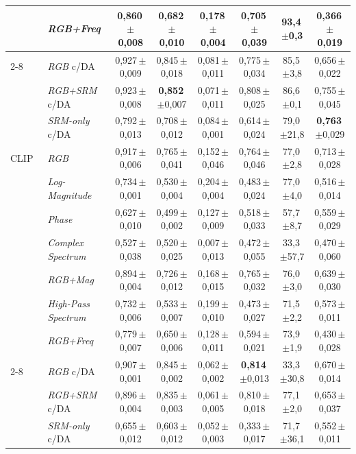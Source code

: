 \documentclass[10pt,conference]{IEEEtran}
\newcommand{\pmsd}[2]{#1\,{\scriptsize$\pm$#2}}
\begin{document}
\begin{table}[!t]
\begin{tabular}{@{}ll ccc ccc@{}}
 & \textit{RGB+Freq} & \pmsd{0,860}{0,008} & \pmsd{0,682}{0,010} & \pmsd{0,178}{0,004} & \pmsd{0,705}{0,039} & \pmsd{\textbf{93,4}}{0,3} & \pmsd{0,366}{0,019} \\
 \cmidrule(l){2-8}
 & \textit{RGB} c/DA & \pmsd{0,927}{0,009} & \pmsd{0,845}{0,018} & \pmsd{0,081}{0,011} & \pmsd{0,775}{0,034} & \pmsd{85,5}{3,8} & \pmsd{0,656}{0,022} \\
 & \textit{RGB+SRM} c/DA & \pmsd{0,923}{0,008} & \pmsd{\textbf{0,852}}{0,007} & \pmsd{0,071}{0,011} & \pmsd{0,808}{0,025} & \pmsd{86,6}{0,1} & \pmsd{0,755}{0,045} \\
 & \textit{SRM-only} c/DA & \pmsd{0,792}{0,013} & \pmsd{0,708}{0,012} & \pmsd{0,084}{0,001} & \pmsd{0,614}{0,024} & \pmsd{79,0}{21,8} & \pmsd{\textbf{0,763}}{0,029} \\
\midrule
CLIP~\cite{ref_clip} & \textit{RGB} & \pmsd{0,917}{0,006} & \pmsd{0,765}{0,041} & \pmsd{0,152}{0,046} & \pmsd{0,764}{0,046} & \pmsd{77,0}{2,8} & \pmsd{0,713}{0,028} \\
 & \textit{Log-Magnitude} & \pmsd{0,734}{0,001} & \pmsd{0,530}{0,004} & \pmsd{0,204}{0,004} & \pmsd{0,483}{0,024} & \pmsd{77,0}{4,0} & \pmsd{0,516}{0,014} \\
 & \textit{Phase} & \pmsd{0,627}{0,010} & \pmsd{0,499}{0,002} & \pmsd{0,127}{0,009} & \pmsd{0,518}{0,033} & \pmsd{57,7}{8,7} & \pmsd{0,559}{0,029} \\
 & \textit{Complex Spectrum} & \pmsd{0,527}{0,038} & \pmsd{0,520}{0,025} & \pmsd{0,007}{0,013} & \pmsd{0,472}{0,055} & \pmsd{33,3}{57,7} & \pmsd{0,470}{0,060} \\
 & \textit{RGB+Mag} & \pmsd{0,894}{0,004} & \pmsd{0,726}{0,012} & \pmsd{0,168}{0,015} & \pmsd{0,765}{0,032} & \pmsd{76,0}{3,0} & \pmsd{0,639}{0,030} \\
 & \textit{High-Pass Spectrum} & \pmsd{0,732}{0,006} & \pmsd{0,533}{0,007} & \pmsd{0,199}{0,010} & \pmsd{0,473}{0,027} & \pmsd{71,5}{2,2} & \pmsd{0,573}{0,011} \\
 & \textit{RGB+Freq} & \pmsd{0,779}{0,007} & \pmsd{0,650}{0,006} & \pmsd{0,128}{0,011} & \pmsd{0,594}{0,021} & \pmsd{73,9}{1,9} & \pmsd{0,430}{0,028} \\
 \cmidrule(l){2-8}
 & \textit{RGB} c/DA & \pmsd{0,907}{0,001} & \pmsd{0,845}{0,002} & \pmsd{0,062}{0,002} & \pmsd{\textbf{0,814}}{0,013} & \pmsd{33,3}{30,8} & \pmsd{0,670}{0,014} \\
 & \textit{RGB+SRM} c/DA & \pmsd{0,896}{0,004} & \pmsd{0,835}{0,003} & \pmsd{0,061}{0,005} & \pmsd{0,810}{0,018} & \pmsd{77,1}{2,0} & \pmsd{0,653}{0,037} \\
 & \textit{SRM-only} c/DA & \pmsd{0,655}{0,012} & \pmsd{0,603}{0,012} & \pmsd{0,052}{0,003} & \pmsd{0,333}{0,017} & \pmsd{71,7}{36,1} & \pmsd{0,552}{0,011} \\
\bottomrule
\end{tabular}
\end{table}
\end{document}
